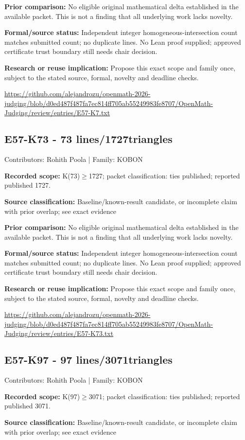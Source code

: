 \documentclass[11pt,a4paper]{article}
\begin{document}
\textbf{Prior comparison:} No eligible original mathematical delta established in the available packet. This is not a finding that all underlying work lacks novelty.

\textbf{Formal/source status:} Independent integer homogeneous-intersection count matches submitted count; no duplicate lines. No Lean proof supplied; approved certificate trust boundary still needs chair decision.

\textbf{Research or reuse implication:} Propose this exact scope and family once, subject to the stated source, formal, novelty and deadline checks.

{\small \url{https://github.com/alejandrozu/openmath-2026-judging/blob/d0ed487f487fa7ec814ff705ab55249983fe8707/OpenMath-Judging/review/entries/E57-K7.txt}\par}

\begin{samepage}
\subsection{E57-K73  -  73 lines/1727triangles}
{\small Contributors: Rohith Poola | Family: KOBON\par}

\textbf{Recorded scope:} K(73)\ensuremath{\geq}1727; packet classification: ties published; reported published 1727.

\end{samepage}
\textbf{Source classification:} Baseline/known-result candidate, or incomplete claim with prior overlap; see exact evidence

\textbf{Prior comparison:} No eligible original mathematical delta established in the available packet. This is not a finding that all underlying work lacks novelty.

\textbf{Formal/source status:} Independent integer homogeneous-intersection count matches submitted count; no duplicate lines. No Lean proof supplied; approved certificate trust boundary still needs chair decision.

\textbf{Research or reuse implication:} Propose this exact scope and family once, subject to the stated source, formal, novelty and deadline checks.

{\small \url{https://github.com/alejandrozu/openmath-2026-judging/blob/d0ed487f487fa7ec814ff705ab55249983fe8707/OpenMath-Judging/review/entries/E57-K73.txt}\par}

\begin{samepage}
\subsection{E57-K97  -  97 lines/3071triangles}
{\small Contributors: Rohith Poola | Family: KOBON\par}

\textbf{Recorded scope:} K(97)\ensuremath{\geq}3071; packet classification: ties published; reported published 3071.

\end{samepage}
\textbf{Source classification:} Baseline/known-result candidate, or incomplete claim with prior overlap; see exact evidence
\end{document}
